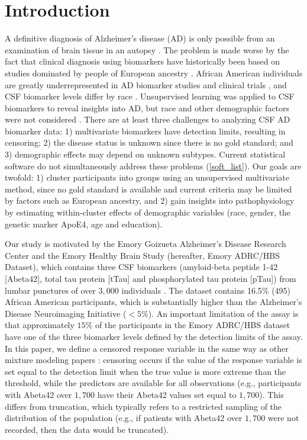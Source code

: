 \documentclass{interact}
\theoremstyle{plain}
\theoremstyle{definition}
\theoremstyle{remark}
\begin{document}
\doublespacing

\section{Introduction}
\label{s:intro}
A definitive diagnosis of Alzheimer's disease (AD) is only possible from an examination of brain tissue in an autopsy \citep{Dubios2007b}. The problem is made worse by the fact that clinical diagnosis using biomarkers have historically been based on studies dominated by people of European ancestry \citep{Blennow2015}. African American individuals are greatly underrepresented in AD biomarker studies and clinical trials \citep{shin2016underrepresentation}, and CSF biomarker levels differ by race \citep{garrett2019racial}. Unsupervised learning was applied to CSF biomarkers to reveal insights into AD, but race and other demographic factors were not considered \citep{Meyer2010}. There are at least three challenges to analyzing CSF AD biomarker data: 1) multivariate biomarkers have detection limits, resulting in censoring; 2) the disease status is unknown since there is no gold standard; and 3) demographic effects may depend on unknown subtypes. Current statistical software do not simultaneously address these problems (\cref{soft_list}). Our goals are twofold: 1) cluster participants into groups using an unsupervised multivariate method, since no gold standard is available and current criteria may be limited by factors such as European ancestry, and 2) gain insights into pathophysiology by estimating within-cluster effects of demographic variables (race, gender, the genetic marker ApoE4, age and education).

Our study is motivated by the Emory Goizueta Alzheimer's Disease Research Center and the Emory Healthy Brain Study (hereafter, Emory ADRC/HBS Dataset), which contains three CSF biomarkers (amyloid-beta peptide 1-42 [Abeta42], total tau protein [tTau] and phosphorylated tau protein [pTau]) from lumbar punctures of over $3,\!000$ individuals \citep{Goetz2019}. The dataset contains 16.5\% (495) African American participants, which is substantially higher than the Alzheimer's Disease Neuroimaging Initiative ($<5\%$). An important limitation of the assay is that approximately $15\%$ of the participants in the Emory ADRC/HBS dataset have one of the three biomarker levels defined by the detection limits of the assay. In this paper, we define a censored response variable in the same way as other mixture modeling papers \citep{Jedidi1993,Lee2012}: censoring occurs if the value of the response variable is set equal to the detection limit when the true value is more extreme than the threshold, while the predictors are available for all observations (e.g., participants with Abeta42 over $1,\!700$ have their Abeta42 values set equal to $1,\!700$). This differs from truncation, which typically refers to a restricted sampling of the distribution of the population (e.g., if patients with Abeta42 over $1,\!700$ were not recorded, then the data would be truncated). 
\end{document}
